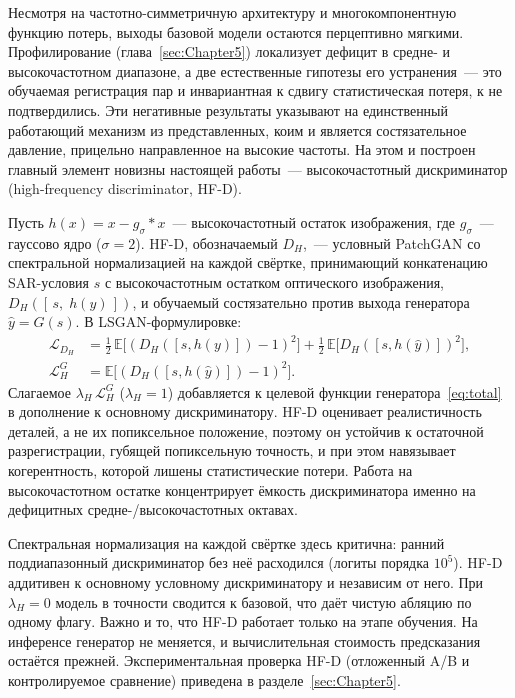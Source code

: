 Несмотря на частотно-симметричную архитектуру и многокомпонентную функцию потерь,
выходы базовой модели остаются перцептивно мягкими.
Профилирование (глава~\ref{sec:Chapter5}) локализует дефицит в средне- и высокочастотном
диапазоне, а две естественные гипотезы его устранения~--- это обучаемая регистрация пар и
инвариантная к сдвигу статистическая потеря, к не подтвердились.
Эти негативные результаты указывают на единственный работающий механизм из представленных, коим и является состязательное
давление, прицельно направленное на высокие частоты. На этом и построен главный элемент
новизны настоящей работы~--- высокочастотный дискриминатор (high-frequency
discriminator, HF-D).

Пусть $h(x)=x-g_\sigma * x$~--- высокочастотный остаток изображения, где $g_\sigma$~---
гауссово ядро ($\sigma=2$). HF-D, обозначаемый $D_H$,~--- условный PatchGAN со
спектральной нормализацией на каждой свёртке, принимающий конкатенацию SAR-условия $s$
с высокочастотным остатком оптического изображения, $D_H([\,s,\;h(y)\,])$, и обучаемый
состязательно против выхода генератора $\hat{y}=G(s)$. В LSGAN-формулировке:
\begin{align}
  \mathcal{L}_{D_H} &= \tfrac{1}{2}\,\mathbb{E}\bigl[(D_H([s,h(y)])-1)^{2}\bigr]
                     + \tfrac{1}{2}\,\mathbb{E}\bigl[D_H([s,h(\hat{y})])^{2}\bigr],\\
  \mathcal{L}^{G}_{H} &= \mathbb{E}\bigl[(D_H([s,h(\hat{y})])-1)^{2}\bigr].
\end{align}
Слагаемое $\lambda_H\,\mathcal{L}^{G}_{H}$ ($\lambda_H=1$) добавляется к целевой функции
генератора~\eqref{eq:total} в дополнение к основному дискриминатору. HF-D
оценивает реалистичность деталей, а не их попиксельное положение, поэтому он устойчив к
остаточной разрегистрации, губящей попиксельную точность, и при этом навязывает
когерентность, которой лишены статистические потери. Работа на высокочастотном остатке
концентрирует ёмкость дискриминатора именно на дефицитных средне-/высокочастотных
октавах.

Спектральная нормализация на каждой свёртке здесь критична: ранний поддиапазонный дискриминатор
без неё расходился (логиты порядка $10^5$). HF-D аддитивен к основному условному
дискриминатору и независим от него. При $\lambda_H=0$ модель в точности сводится к
базовой, что даёт чистую абляцию по одному флагу. Важно и то, что HF-D работает
только на этапе обучения. На инференсе генератор не меняется, и вычислительная
стоимость предсказания остаётся прежней. Экспериментальная проверка HF-D (отложенный A/B и
контролируемое сравнение) приведена в разделе~\ref{sec:Chapter5}.

\newpage